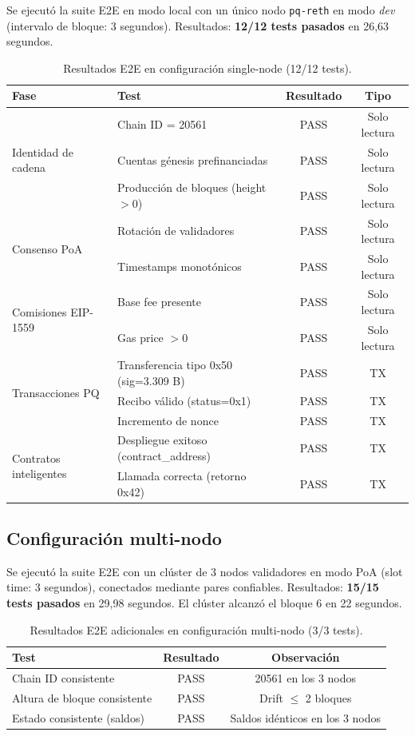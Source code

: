Se ejecutó la suite E2E en modo local con un único nodo \texttt{pq-reth} en modo \emph{dev} (intervalo de bloque: 3 segundos). Resultados: \textbf{12/12 tests pasados} en 26,63 segundos.

\begin{table}[htbp]
\centering
\caption{Resultados E2E en configuración single-node (12/12 tests).}
\label{tab:e2e_single}
\begin{tabular}{@{}llcc@{}}
\toprule
\textbf{Fase} & \textbf{Test} & \textbf{Resultado} & \textbf{Tipo} \\
\midrule
\multirow{3}{*}{Identidad de cadena} & Chain ID = 20561 & PASS & Solo lectura \\
 & Cuentas génesis prefinanciadas & PASS & Solo lectura \\
 & Producción de bloques (height $> 0$) & PASS & Solo lectura \\
\midrule
\multirow{2}{*}{Consenso PoA} & Rotación de validadores & PASS & Solo lectura \\
 & Timestamps monotónicos & PASS & Solo lectura \\
\midrule
\multirow{2}{*}{Comisiones EIP-1559} & Base fee presente & PASS & Solo lectura \\
 & Gas price $> 0$ & PASS & Solo lectura \\
\midrule
\multirow{3}{*}{Transacciones PQ} & Transferencia tipo 0x50 (sig=3.309 B) & PASS & TX \\
 & Recibo válido (status=0x1) & PASS & TX \\
 & Incremento de nonce & PASS & TX \\
\midrule
\multirow{2}{*}{Contratos inteligentes} & Despliegue exitoso (contract\_address) & PASS & TX \\
 & Llamada correcta (retorno 0x42) & PASS & TX \\
\bottomrule
\end{tabular}
\end{table}

\subsection{Configuración multi-nodo}

Se ejecutó la suite E2E con un clúster de 3 nodos validadores en modo PoA (slot time: 3 segundos), conectados mediante pares confiables. Resultados: \textbf{15/15 tests pasados} en 29,98 segundos. El clúster alcanzó el bloque 6 en 22 segundos.

\begin{table}[htbp]
\centering
\caption{Resultados E2E adicionales en configuración multi-nodo (3/3 tests).}
\label{tab:e2e_multi}
\begin{tabular}{@{}lcc@{}}
\toprule
\textbf{Test} & \textbf{Resultado} & \textbf{Observación} \\
\midrule
Chain ID consistente & PASS & 20561 en los 3 nodos \\
Altura de bloque consistente & PASS & Drift $\leq$ 2 bloques \\
Estado consistente (saldos) & PASS & Saldos idénticos en los 3 nodos \\
\bottomrule
\end{tabular}
\end{table}



